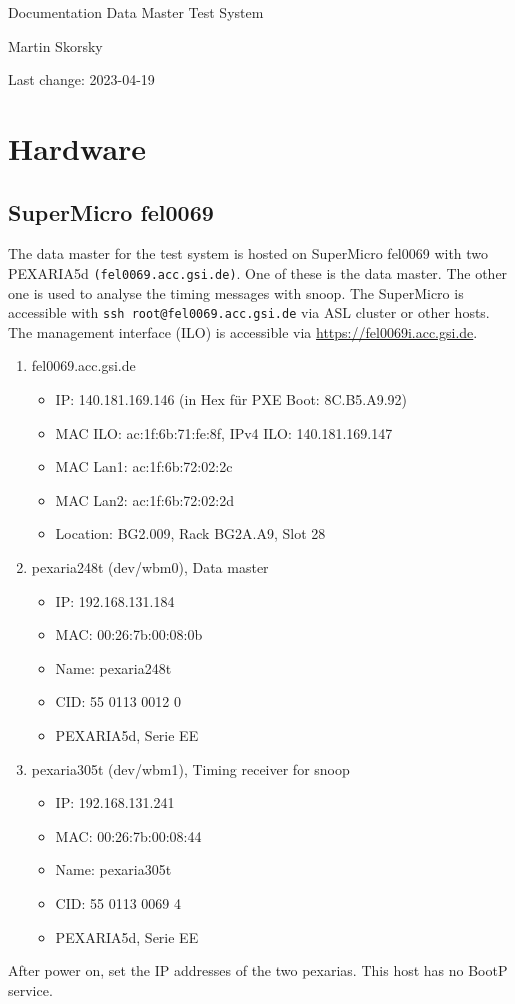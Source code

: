 \documentclass[12pt,a4paper]{report}
\begin{document}
\begin{titlepage}
\vspace{2cm}
\begin{center}
\Huge{Documentation Data Master Test System}

\Large{Martin Skorsky}

\Large{Last change: 2023-04-19}
\end{center}
\vfill
\end{titlepage}

\tableofcontents

\chapter{Hardware}
\section{SuperMicro fel0069}
The data master for the test system is hosted on SuperMicro fel0069 with two PEXARIA5d \texttt{(fel0069.acc.gsi.de)}.
One of these is the data master. The other one is used to analyse the timing messages with snoop.
The SuperMicro is accessible with \texttt{ssh root@fel0069.acc.gsi.de} via ASL cluster or other hosts.
The management interface (ILO) is accessible via \url{https://fel0069i.acc.gsi.de}.
\begin{enumerate}
\item fel0069.acc.gsi.de
\begin{itemize}
\item IP: 140.181.169.146 (in Hex für PXE Boot: 8C.B5.A9.92)
\item MAC ILO: ac:1f:6b:71:fe:8f, IPv4 ILO: 140.181.169.147
\item MAC Lan1: ac:1f:6b:72:02:2c
\item MAC Lan2: ac:1f:6b:72:02:2d
\item Location: BG2.009, Rack BG2A.A9, Slot 28
\end{itemize}
\item pexaria248t (dev/wbm0), Data master
\begin{itemize}
\item IP: 192.168.131.184
\item MAC: 00:26:7b:00:08:0b
\item Name: pexaria248t
\item CID: 55 0113 0012 0
\item PEXARIA5d, Serie EE
\end{itemize}
\item pexaria305t (dev/wbm1), Timing receiver for snoop
\begin{itemize}
\item IP: 192.168.131.241
\item MAC: 00:26:7b:00:08:44
\item Name: pexaria305t
\item CID: 55 0113 0069 4
\item PEXARIA5d, Serie EE
\end{itemize}
\end{enumerate}
After power on, set the IP addresses of the two pexarias. This host has no BootP service.
\end{document}
